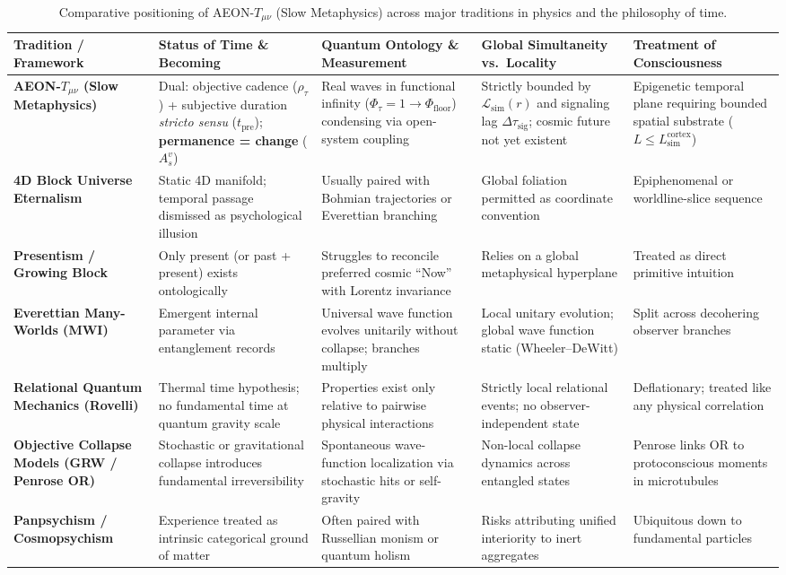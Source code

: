 \documentclass[11pt,a4paper]{article}
\begin{document}
\begin{table}[h!]
\centering
\scriptsize
\begin{tabularx}{\textwidth}{>{\bfseries}p{2.3cm} X X X X}
\toprule
Tradition / Framework & Status of Time \& Becoming & Quantum Ontology \& Measurement & Global Simultaneity vs.\ Locality & Treatment of Consciousness \\
\midrule
AEON-$T_{\mu\nu}$ (Slow Metaphysics) & Dual: objective cadence ($\rho_\tau$) + subjective duration \emph{stricto sensu} ($t_{\mathrm{pre}}$); \textbf{permanence = change} ($A_s^v$) & Real waves in functional infinity ($\Phi_\tau = 1 \to \Phi_{\mathrm{floor}}$) condensing via open-system coupling & Strictly bounded by $\mathcal{L}_{\mathrm{sim}}(r)$ and signaling lag $\Delta\tau_{\mathrm{sig}}$; cosmic future not yet existent & Epigenetic temporal plane requiring bounded spatial substrate ($L \le L_{\mathrm{sim}}^{\mathrm{cortex}}$) \\
\addlinespace
4D Block Universe Eternalism & Static 4D manifold; temporal passage dismissed as psychological illusion & Usually paired with Bohmian trajectories or Everettian branching & Global foliation permitted as coordinate convention & Epiphenomenal or worldline-slice sequence \\
\addlinespace
Presentism / Growing Block & Only present (or past + present) exists ontologically & Struggles to reconcile preferred cosmic ``Now'' with Lorentz invariance & Relies on a global metaphysical hyperplane & Treated as direct primitive intuition \\
\addlinespace
Everettian Many-Worlds (MWI) & Emergent internal parameter via entanglement records & Universal wave function evolves unitarily without collapse; branches multiply & Local unitary evolution; global wave function static (Wheeler--DeWitt) & Split across decohering observer branches \\
\addlinespace
Relational Quantum Mechanics (Rovelli) & Thermal time hypothesis; no fundamental time at quantum gravity scale & Properties exist only relative to pairwise physical interactions & Strictly local relational events; no observer-independent state & Deflationary; treated like any physical correlation \\
\addlinespace
Objective Collapse Models (GRW / Penrose OR) & Stochastic or gravitational collapse introduces fundamental irreversibility & Spontaneous wave-function localization via stochastic hits or self-gravity & Non-local collapse dynamics across entangled states & Penrose links OR to protoconscious moments in microtubules \\
\addlinespace
Panpsychism / Cosmopsychism & Experience treated as intrinsic categorical ground of matter & Often paired with Russellian monism or quantum holism & Risks attributing unified interiority to inert aggregates & Ubiquitous down to fundamental particles \\
\bottomrule
\end{tabularx}
\caption{Comparative positioning of AEON-$T_{\mu\nu}$ (Slow Metaphysics) across major traditions in physics and the philosophy of time.}
\label{tab:paradigms}
\end{table}
\end{document}
